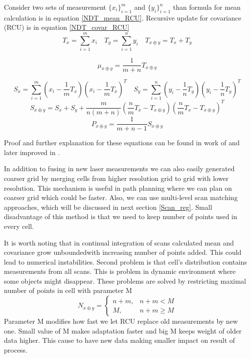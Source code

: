 Consider two sets of measurement $\{x_{i}\}^{m}_{i=1}$ and $\{y_{i}\}^{n}_{i=1}$ than formula for mean calculation is in equation \eqref{NDT_mean_RCU}. Recursive update for covariance (RCU) is in equation \eqref{NDT_covar_RCU}
\begin{equation}
T_{x} = \sum_{i =1}^{m}x_{i} \quad
T_{y} = \sum_{i =1}^{n}y_{i} \quad
T_{x\oplus y} = T_{x} + T_{y} 
\end{equation}

\begin{equation}
\label{NDT_mean_RCU}
\mu_{x\oplus y} =\dfrac{1}{m + n}T_{x\oplus y}
\end{equation} 

\begin{equation}
S_{x} = \sum_{i=1}^{m}(x_{i} - \frac{1}{m}T_{x})(x_{i} - \frac{1}{m}T_{x})^{T} \quad 
S_{y} = \sum_{i=1}^{n}(y_{i} - \frac{1}{n}T_{y})(y_{i} - \frac{1}{n}T_{y})^{T}
\end{equation}
\begin{equation}
S_{x\oplus y} = S_{x} + S_{y} + \dfrac{m}{n(m+n)}(\frac{n}{m}T_{x} - T_{x\oplus y})(\frac{n}{m}T_{x} - T_{x\oplus y})^{T}
\end{equation}
\begin{equation}
\label{NDT_covar_RCU}
P_{x\oplus y} = \dfrac{1}{m+n -1}S_{x\oplus y}
\end{equation}

Proof and further explanation for these equations can be found in work of \cite{Saarinen13} and later improved in \cite{Saarinen213}.

In addition to fusing in new laser measurements we can also easily generated coarser grid by merging cells from higher resolution grid to grid with lower resolution. This mechanism is useful in path planning where we can plan on coarser grid which could be faster. Also, we can use multi-level scan matching approaches, which will be discussed in next section \ref{Scan_reg}. Small disadvantage of this method is that we need to keep number of points used in every cell.

It is worth noting that in continual integration of scans calculated mean and covariance grow unboundedwith increasing number of points added. This could lead to numerical instabilities. Second problem is that cell's distribution contains measurements from all scans. This is problem in dynamic environment where some objects might disappear. These problems are solved by restricting maximal number of points in cell with parameter M
\begin{equation}
N_{x \oplus y} = 
\begin{cases}
n+m, & n+m < M \\
M, & n+m \geq M
\end{cases} 
\end{equation}
Parameter M modifies how fast we let RCU replace old measurements by new one. Small value of M makes adaptation faster and big M keeps weight of older data higher. This cause to have new data making smaller impact on result of process. 

